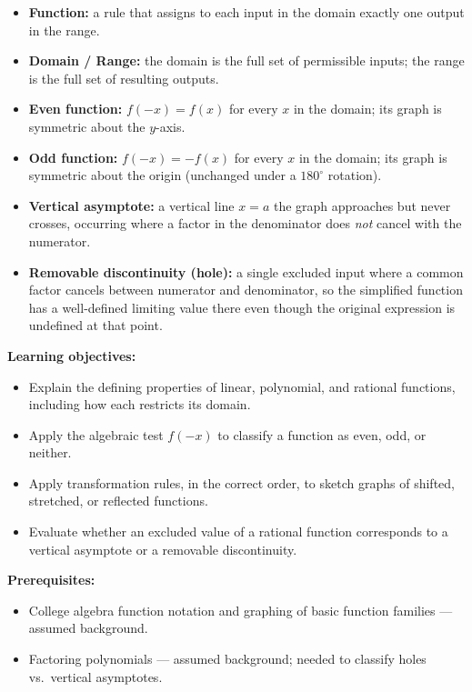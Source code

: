 \documentclass{article}
\begin{document}
\begin{keydefs}
\begin{itemize}[leftmargin=*]
  \item \textbf{Function:} a rule that assigns to each input in the domain exactly one output in the range.
  \item \textbf{Domain / Range:} the domain is the full set of permissible inputs; the range is the full set of resulting outputs.
  \item \textbf{Even function:} $f(-x)=f(x)$ for every $x$ in the domain; its graph is symmetric about the $y$-axis.
  \item \textbf{Odd function:} $f(-x)=-f(x)$ for every $x$ in the domain; its graph is symmetric about the origin (unchanged under a $180^\circ$ rotation).
  \item \textbf{Vertical asymptote:} a vertical line $x=a$ the graph approaches but never crosses, occurring where a factor in the denominator does \emph{not} cancel with the numerator.
  \item \textbf{Removable discontinuity (hole):} a single excluded input where a common factor cancels between numerator and denominator, so the simplified function has a well-defined limiting value there even though the original expression is undefined at that point.
\end{itemize}
\end{keydefs}

\textbf{Learning objectives:}
\begin{itemize}[leftmargin=*]
  \item Explain the defining properties of linear, polynomial, and rational functions, including how each restricts its domain.
  \item Apply the algebraic test $f(-x)$ to classify a function as even, odd, or neither.
  \item Apply transformation rules, in the correct order, to sketch graphs of shifted, stretched, or reflected functions.
  \item Evaluate whether an excluded value of a rational function corresponds to a vertical asymptote or a removable discontinuity.
\end{itemize}

\textbf{Prerequisites:}
\begin{itemize}[leftmargin=*]
  \item College algebra function notation and graphing of basic function families --- assumed background.
  \item Factoring polynomials --- assumed background; needed to classify holes vs.\ vertical asymptotes.
\end{itemize}
\end{document}
